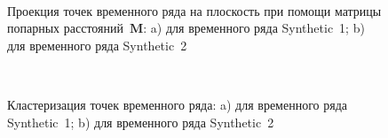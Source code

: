 \begin{figure}[h!t]\center
{}
\\
\caption{Проекция точек временного ряда на плоскость при помощи матрицы попарных расстояний~$\textbf{M}$: a) для временного ряда Synthetic~1; b) для временного ряда Synthetic~2}
\label{fig_synthetic_2D}
\end{figure}

\begin{figure}[h!t]\center
{}
\\
\caption{Кластеризация точек временного ряда: a) для временного ряда Synthetic~1; b) для временного ряда Synthetic~2}
\label{fig_synthetic_claster}
\end{figure}


